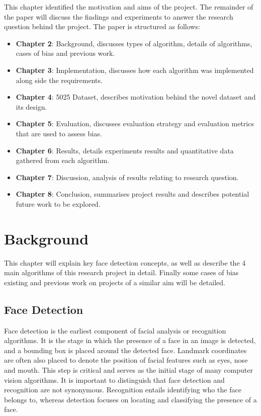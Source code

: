 \documentclass{l4proj}
\begin{document}
This chapter identified the motivation and aims of the project. The remainder of the paper will discuss the findings and experiments to answer the research question behind the project. The paper is structured as follows:
\begin{itemize}
    \item \textbf{Chapter 2}: Background, discusses types of algorithm, details of algorithms, cases of bias and previous work.
    \item \textbf{Chapter 3}: Implementation, discusses how each algorithm was implemented along side the requirements.
    \item \textbf{Chapter 4}: 5025 Dataset, describes motivation behind the novel dataset and its design.
    \item \textbf{Chapter 5}: Evaluation, discusses evaluation strategy and evaluation metrics that are used to assess bias.
    \item \textbf{Chapter 6}: Results, details experiments results and quantitative data gathered from each algorithm.
    \item \textbf{Chapter 7}: Discussion, analysis of results relating to research question.
    \item \textbf{Chapter 8}: Conclusion, summarises project results and describes potential future work to be explored.
\end{itemize}
\chapter{Background}
\label{background}
This chapter will explain key face detection concepts, as well as describe the 4 main algorithms of this research project in detail. Finally some cases of bias existing and previous work on projects of a similar aim will be detailed.
\section{Face Detection}
\label{facedetection}

Face detection is the earliest component of facial analysis or recognition algorithms. It is the stage in which the presence of a face in an image is detected, and a bounding box is placed around the detected face. Landmark coordinates are often also placed to denote the position of facial features such as eyes, nose and mouth. This step is critical and serves as the initial stage of many computer vision algorithms. It is important to distinguish that face detection and recognition are not synonymous. Recognition entails identifying who the face belongs to, whereas detection focuses on locating and classifying the presence of a face.
\end{document}
